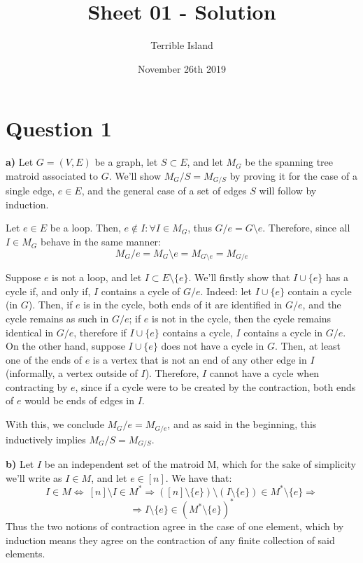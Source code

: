 \documentclass[12pt]{article}
\title{\textbf{Sheet 01 - Solution}}
\author{Terrible Island}
\date{November 26th 2019}
\begin{document}
\maketitle

\setlength{\baselineskip}{0.6cm}

\section{Question 1}

\textbf{a)} Let $G = (V,E)$ be a graph, let $S \subset E$, and let $M_{G}$ be the spanning tree matroid associated to $G$. We'll show $M_{G}/S = M_{G/S}$ by proving it for the case of a single edge, $e \in E$, and the general case of a set of edges $S$ will follow by induction.

Let $e \in E$ be a loop. Then, $e \notin I : \forall I \in M_{G}$, thus $G/e = G \setminus e$. Therefore, since all $I \in M_{G}$ behave in the same manner: $$M_{G}/e = M_{G} \setminus e = M_{G \setminus e} = M_{G/e}$$

Suppose $e$ is not a loop, and let $I \subset E \setminus \lbrace e \rbrace$. We'll firstly show that $I \cup \lbrace e \rbrace$ has a cycle if, and only if, $I$ contains a cycle of $G/e$. Indeed: let $I \cup \lbrace e \rbrace$ contain a cycle (in $G$). Then, if $e$ is in the cycle, both ends of it are identified in $G/e$, and the cycle remains as such in $G/e$; if $e$ is not in the cycle, then the cycle remains identical in $G/e$, therefore if $I \cup \lbrace e \rbrace$ contains a cycle, $I$ contains a cycle in $G/e$. On the other hand, suppose $I \cup \lbrace e \rbrace$ does not have a cycle in $G$. Then, at least one of the ends of $e$ is a vertex that is not an end of any other edge in $I$ (informally, a vertex outside of $I$). Therefore, $I$ cannot have a cycle when contracting by $e$, since if a cycle were to be created by the contraction, both ends of $e$ would be ends of edges in $I$.

With this, we conclude $M_{G}/e = M_{G/e}$, and as said in the beginning, this inductively implies $M_{G}/S = M_{G/S}$.

\textbf{b)} Let $I$ be an independent set of the matroid M, which for the sake of simplicity we'll write as $I \in M$, and let $e \in [n]$. We have that: $$I \in M \Leftrightarrow \ [n] \setminus I \in M^{*} \Rightarrow ([n] \setminus \lbrace e \rbrace) \setminus (I \setminus \lbrace e \rbrace ) \in M^{*} \setminus \lbrace e \rbrace \Rightarrow$$ $$\Rightarrow I \setminus \lbrace e \rbrace \in (M^{*} \setminus \lbrace e \rbrace ) ^{*}$$ 
Thus the two notions of contraction agree in the case of one element, which by induction means they agree on the contraction of any finite collection of said elements.
\end{document}

